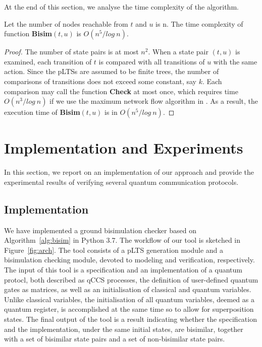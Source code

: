 \documentclass[a4paper,UKenglish,cleveref, autoref]{lipics-v2019}
\begin{document}
At the end of this section, we analyse the time complexity of the algorithm.

\begin{theorem}[Complexity]
Let the number of nodes reachable from $t$ and $u$ is n. The time complexity of function \textbf{Bisim}$(t,u)$ is $O(n^5/log\ n)$. %
\end{theorem}
\begin{proof}
 The number of state pairs is at most $n^2$. When a state pair $(t,u)$ is examined, each transition of $t$ is compared with all transitions of $u$ with the same action. Since the pLTSs are assumed to be finite trees, the number of comparisons of transitions does not exceed some constant, say $k$. Each comparison may call the function \textbf{Check} at most once, which requires time $O(n^3/log\ n)$ if we use the maximum network flow algorithm in \cite{CHM90}. As a result, the execution time of \textbf{Bisim}$(t,u)$ is in $O(n^5/log\ n)$.
\end{proof}

\section{Implementation and Experiments}
\label{sec:experiment}
In this section, we report on an implementation of our approach and provide the experimental results of verifying several quantum communication protocols. 
\subsection{Implementation}
We have implemented a ground bisimulation checker based on Algorithm~\ref{alg:bisim} in Python 3.7. The workflow of our tool is sketched in Figure~\ref{fig:arch}. The tool consists of a pLTS generation module and a bisimulation checking module, devoted to modeling and verification, respectively.
The input of this tool is a specification and an implementation of a quantum protocl, both described as qCCS processes, the definition of user-defined quantum gates  as matrices, as well as an initialisation of classical and quantum variables. Unlike classical variables, the initialisation of all quantum variables, deemed as a quantum register, is accomplished at the same time so to allow for superposition states.
The final output of the tool is a result indicating whether the specification and the implementation, under the same initial states, are bisimilar, together with a set of bisimilar state pairs and  a set of non-bisimilar state pairs.
%
\end{document}
